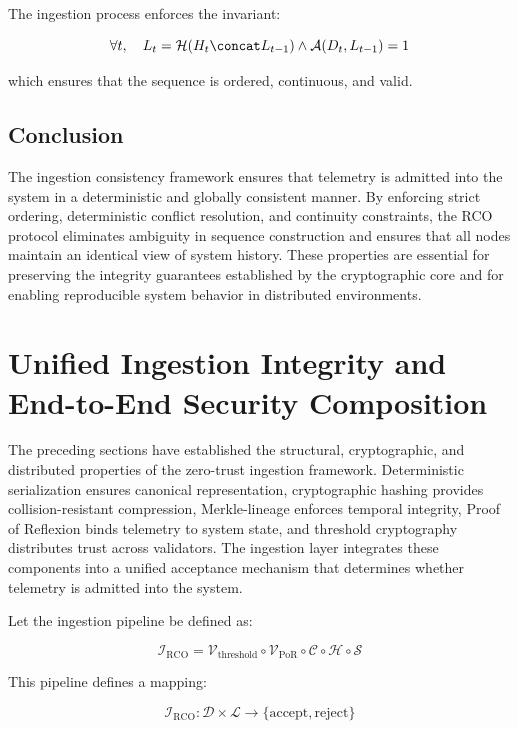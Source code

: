 The ingestion process enforces the invariant:

\begin{equation}
\forall t, \quad L_t = \mathcal{H}(H_t \concat L_{t-1}) \land \mathcal{A}(D_t, L_{t-1}) = 1
\end{equation}

which ensures that the sequence is ordered, continuous, and valid.

\subsection{Conclusion}

The ingestion consistency framework ensures that telemetry is admitted into the system in a deterministic and globally consistent manner. By enforcing strict ordering, deterministic conflict resolution, and continuity constraints, the RCO protocol eliminates ambiguity in sequence construction and ensures that all nodes maintain an identical view of system history. These properties are essential for preserving the integrity guarantees established by the cryptographic core and for enabling reproducible system behavior in distributed environments.

\section{Unified Ingestion Integrity and End-to-End Security Composition}

The preceding sections have established the structural, cryptographic, and distributed properties of the zero-trust ingestion framework. Deterministic serialization ensures canonical representation, cryptographic hashing provides collision-resistant compression, Merkle-lineage enforces temporal integrity, Proof of Reflexion binds telemetry to system state, and threshold cryptography distributes trust across validators. The ingestion layer integrates these components into a unified acceptance mechanism that determines whether telemetry is admitted into the system.

Let the ingestion pipeline be defined as:

\begin{equation}
\mathcal{I}_{\text{RCO}} = \mathcal{V}_{\text{threshold}} \circ \mathcal{V}_{\text{PoR}} \circ \mathcal{C} \circ \mathcal{H} \circ \mathcal{S}
\end{equation}

This pipeline defines a mapping:

\begin{equation}
\mathcal{I}_{\text{RCO}}: \mathcal{D} \times \mathcal{L} \rightarrow \{\text{accept}, \text{reject}\}
\end{equation}

